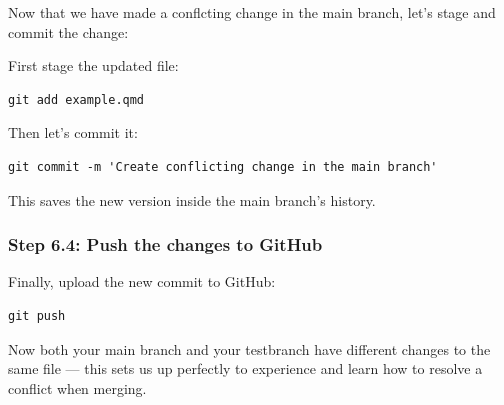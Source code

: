 \documentclass[
  11pt,
  a4paper,
]{article}
\begin{document}
Now that we have made a conflcting change in the main branch, let's
stage and commit the change:

First stage the updated file:

\begin{verbatim}
git add example.qmd
\end{verbatim}

Then let's commit it:

\begin{verbatim}
git commit -m 'Create conflicting change in the main branch'
\end{verbatim}

This saves the new version inside the main branch's history.

\subsubsection{Step 6.4: Push the changes to
GitHub}\label{step-6.4-push-the-changes-to-github}

Finally, upload the new commit to GitHub:

\begin{verbatim}
git push
\end{verbatim}

Now both your main branch and your testbranch have different changes to
the same file --- this sets us up perfectly to experience and learn how
to resolve a conflict when merging.
\end{document}
